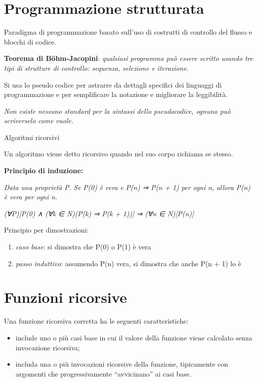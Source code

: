 \section{Programmazione strutturata}\label{programmazione-strutturata}

Paradigma di programmazione basato sull'uso di costrutti di controllo
del flusso e blocchi di codice.

\textbf{Teorema di Böhm-Jacopini}: \emph{qualsiasi programma può essere
scritto usando tre tipi di strutture di controllo: sequenza, selezione e
iterazione.}

Si usa lo pseudo codice per astrarre da dettagli specifici dei linguaggi
di programmazione e per semplificare la notazione e migliorare la
leggibilità.

\emph{Non esiste nessuno standard per la sintassi dello pseudocodice,
ognuno può scriverselo come vuole.}

Algoritmi ricorsivi

Un algoritmo viene detto ricorsivo quando nel suo corpo richiama se
stesso.

\textbf{Principio di induzione:}

\emph{Data una proprietà P. Se P(0) è vera e P(n) ⇒ P(n + 1) per ogni n,
allora P(n) è vera per ogni n.}

\emph{(∀P){[}P(0) ∧ (∀k ∈ N)(P(k) ⇒ P(k + 1)){]} ⇒ (∀n ∈ N){[}P(n){]}}

Principio per dimostrazioni:

\begin{enumerate}
\def\labelenumi{\arabic{enumi}.}
\item
  \emph{caso base}: si dimostra che P(0) o P(1) è vera
\item
  \emph{passo induttivo}: assumendo P(n) vera, si dimostra che anche P(n
  + 1) lo è
\end{enumerate}

\section{Funzioni ricorsive}\label{funzioni-ricorsive}

Una funzione ricorsiva corretta ha le seguenti caratteristiche:

\begin{itemize}
\item
  include uno o più casi base in cui il valore della funzione viene
  calcolato senza invocazione ricorsiva;
\item
  includa una o più invocazioni ricorsive della funzione, tipicamente
  con argomenti che progressivamente ``avvicinano'' ai casi base.
\end{itemize}

